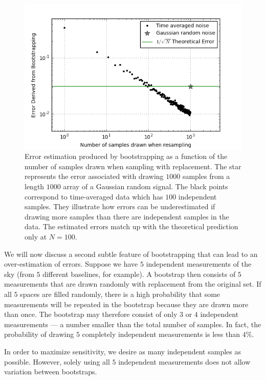\documentclass[preprint2,numberedappendix,tighten]{aastex6}  %
\begin{document}
\begin{figure}
	\centering
	\includegraphics[trim={0.3cm 0.3cm 0.3cm 0.3cm},width=\columnwidth]{plots/toy_error1.png}
	\caption{Error estimation produced by bootstrapping as a function of the number of samples drawn when sampling with replacement. The star represents the error associated with drawing $1000$ samples from a length $1000$ array of a Gaussian random signal. The black points correspond to time-averaged data which has $100$ independent samples. They illustrate how errors can be underestimated if drawing more samples than there are independent samples in the data. The estimated errors match up with the theoretical prediction only at $N=100$.}
	\label{fig:toy_error1}
\end{figure}

We will now discuss a second subtle feature of bootstrapping that can lead to an over-estimation of errors. Suppose we have $5$ independent measurements of the sky (from $5$ different baselines, for example). A bootstrap then consists of $5$ measurements that are drawn randomly with replacement from the original set. If all $5$ spaces are filled randomly, there is a high probability that some measurements will be repeated in the bootstrap because they are drawn more than once. The bootstrap may therefore consist of only $3$ or $4$ independent measurements --- a number smaller than the total number of samples.  In fact, the probability of drawing $5$ completely independent measurements is less than $4\%$.

In order to maximize sensitivity, we desire as many independent samples as possible. However, solely using all $5$ independent measurements does not allow variation between bootstraps. 
\end{document}
